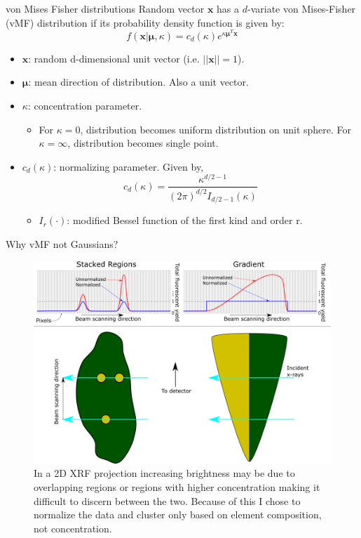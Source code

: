 \documentclass[
]{beamer}
\begin{document}
\begin{frame}{von Mises Fisher distributions}%
Random vector $\boldsymbol{x}$ has a $d$-variate von Mises-Fisher (vMF) distribution if its probability density function is given by:
$$f(\boldsymbol{x}|\boldsymbol{\mu}, \kappa) = c_d(\kappa)e^{\kappa\boldsymbol{\mu}^T\mathbf{x}}$$
\begin{itemize}
  \item $\boldsymbol{x}$: random d-dimensional unit vector (i.e. $||\boldsymbol{x}|| = 1$).
  \item $\boldsymbol{\mu}$: mean direction of distribution. Also a unit vector.
  \item $\kappa$: concentration parameter.
  \begin{itemize}
    \item For $\kappa = 0$, distribution becomes uniform distribution on unit sphere. For $\kappa = \infty$, distribution becomes single point.
  \end{itemize}
  \item $c_d(\kappa)$: normalizing parameter. Given by,
  $$c_d(\kappa) = \frac{\kappa^{d/2-1}}{(2\pi)^{d/2}I_{d/2-1}(\kappa)}$$
  \begin{itemize}
      \item $I_r(\cdot)$: modified Bessel function of the first kind and order r.
  \end{itemize}
\end{itemize}
\end{frame}

\begin{frame}{Why vMF not Gaussians?}
\begin{figure}[h]
  \includegraphics[width=1\textwidth,height=.5\textheight,keepaspectratio]{Normalization.png}
  \caption{In a 2D XRF projection increasing brightness may be due to overlapping regions or regions with higher concentration making it difficult to discern between the two. Because of this I chose to normalize the data and cluster only based on element composition, not concentration.}
\end{figure}
\end{frame}
\end{document}
